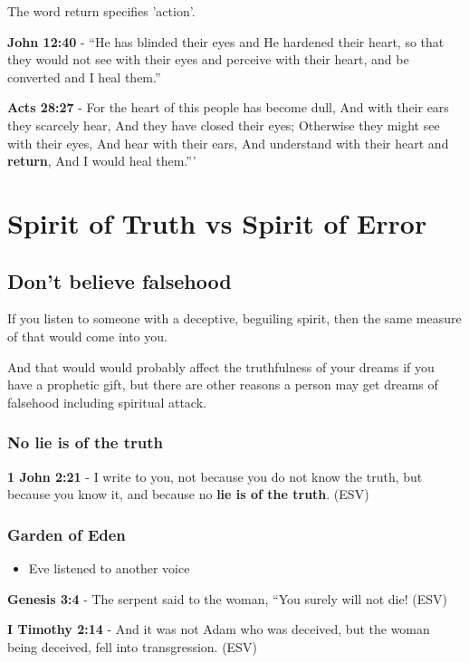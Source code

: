 \documentclass[11pt]{article}
\begin{document}
The word return specifies 'action'.

\textbf{John 12:40} - “He has blinded their eyes and He hardened their heart, so that they would not see with their eyes and perceive with their heart, and be converted and I heal them.”

\textbf{Acts 28:27} - For the heart of this people has become dull, And with their ears they scarcely hear, And they have closed their eyes; Otherwise they might see with their eyes, And hear with their ears, And understand with their heart and \textbf{return}, And I would heal them.”’

\section{Spirit of Truth vs Spirit of Error}
\label{sec:orge0a304f}
\subsection{Don't believe falsehood}
\label{sec:org29e670d}
If you listen to someone with a deceptive, beguiling spirit, then the same measure of that would come into you.

And that would would probably affect the truthfulness of your dreams if you have a prophetic gift, but there are other reasons a person may get dreams of falsehood including spiritual attack.

\subsubsection{No lie is of the truth}
\label{sec:org874bc63}
\textbf{1 John 2:21} -  I write to you, not because you do not know the truth, but because you know it, and because no \textbf{lie is of the truth}.  (ESV)

\subsubsection{Garden of Eden}
\label{sec:orga0b98eb}
\begin{itemize}
\item Eve listened to another voice
\end{itemize}

\textbf{Genesis 3:4} - The serpent said to the woman, “You surely will not die! (ESV)

\textbf{I Timothy 2:14} - And it was not Adam who was deceived, but the woman being deceived, fell into transgression. (ESV)
\end{document}
